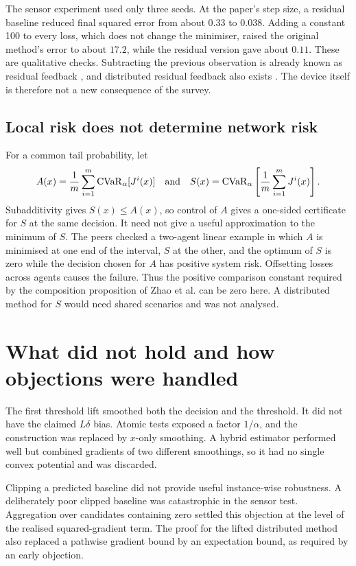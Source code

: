 \documentclass{article}
\newcommand{\CVaR}{\operatorname{CVaR}}
\begin{document}
The sensor experiment used only three seeds. At the paper's step size, a residual baseline reduced final squared error from about $0.33$ to $0.038$. Adding a constant 100 to every loss, which does not change the minimiser, raised the original method's error to about $17.2$, while the residual version gave about $0.11$. These are qualitative checks. Subtracting the previous observation is already known as residual feedback \cite{zhang2022residual}, and distributed residual feedback also exists \cite{distributedresidual}. The device itself is therefore not a new consequence of the survey.

\subsection{Local risk does not determine network risk}

For a common tail probability, let
\begin{equation}
 A(x)=\frac1m\sum_{i=1}^m\CVaR_\alpha[J^i(x)]
 \quad\hbox{and}\quad
 S(x)=\CVaR_\alpha\left[\frac1m\sum_{i=1}^mJ^i(x)\right].
\end{equation}
Subadditivity gives $S(x)\leq A(x)$, so control of $A$ gives a one-sided certificate for $S$ at the same decision. It need not give a useful approximation to the minimum of $S$. The peers checked a two-agent linear example in which $A$ is minimised at one end of the interval, $S$ at the other, and the optimum of $S$ is zero while the decision chosen for $A$ has positive system risk. Offsetting losses across agents causes the failure. Thus the positive comparison constant required by the composition proposition of Zhao et al. can be zero here. A distributed method for $S$ would need shared scenarios and was not analysed.

\section{What did not hold and how objections were handled}

The first threshold lift smoothed both the decision and the threshold. It did not have the claimed $L\delta$ bias. Atomic tests exposed a factor $1/\alpha$, and the construction was replaced by $x$-only smoothing. A hybrid estimator performed well but combined gradients of two different smoothings, so it had no single convex potential and was discarded.

Clipping a predicted baseline did not provide useful instance-wise robustness. A deliberately poor clipped baseline was catastrophic in the sensor test. Aggregation over candidates containing zero settled this objection at the level of the realised squared-gradient term. The proof for the lifted distributed method also replaced a pathwise gradient bound by an expectation bound, as required by an early objection.
\end{document}
